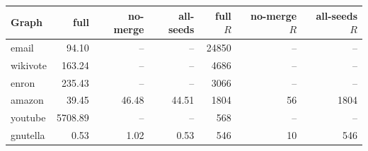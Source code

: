 \begin{tabular}{lrrrrrr}
\toprule
Graph & full & no-merge & all-seeds & full $R$ & no-merge $R$ & all-seeds $R$ \\
\midrule
email & 94.10 & -- & -- & 24850 & -- & -- \\
wikivote & 163.24 & -- & -- & 4686 & -- & -- \\
enron & 235.43 & -- & -- & 3066 & -- & -- \\
amazon & 39.45 & 46.48 & 44.51 & 1804 & 56 & 1804 \\
youtube & 5708.89 & -- & -- & 568 & -- & -- \\
gnutella & 0.53 & 1.02 & 0.53 & 546 & 10 & 546 \\
\bottomrule
\end{tabular}
